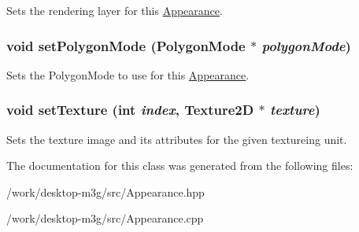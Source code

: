 Sets the rendering layer for this \hyperlink{classm3g_1_1Appearance}{Appearance}. \hypertarget{classm3g_1_1Appearance_cc21fac7868e2ad37e689ac642db1aae}{
\subsubsection[{setPolygonMode}]{\setlength{\rightskip}{0pt plus 5cm}void setPolygonMode (PolygonMode $\ast$ {\em polygonMode})}}
\label{classm3g_1_1Appearance_cc21fac7868e2ad37e689ac642db1aae}


Sets the PolygonMode to use for this \hyperlink{classm3g_1_1Appearance}{Appearance}. \hypertarget{classm3g_1_1Appearance_493e54b1c7ab839b9e76b28e0629cf6a}{
\subsubsection[{setTexture}]{\setlength{\rightskip}{0pt plus 5cm}void setTexture (int {\em index}, \/  {\bf Texture2D} $\ast$ {\em texture})}}
\label{classm3g_1_1Appearance_493e54b1c7ab839b9e76b28e0629cf6a}


Sets the texture image and its attributes for the given textureing unit. 

The documentation for this class was generated from the following files:\begin{CompactItemize}
\item 
/work/desktop-m3g/src/Appearance.hpp\item 
/work/desktop-m3g/src/Appearance.cpp\end{CompactItemize}
